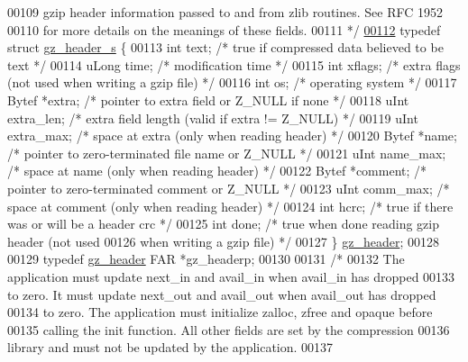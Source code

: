 \begin{DoxyCode}
00109 \textcolor{comment}{     gzip header information passed to and from zlib routines.  See RFC 1952}
00110 \textcolor{comment}{  for more details on the meanings of these fields.}
00111 \textcolor{comment}{*/}
\hyperlink{structgz__header__s}{00112} \textcolor{keyword}{typedef} \textcolor{keyword}{struct }\hyperlink{structgz__header__s}{gz\_header\_s} \{
00113     \textcolor{keywordtype}{int}     text;       \textcolor{comment}{/* true if compressed data believed to be text */}
00114     uLong   time;       \textcolor{comment}{/* modification time */}
00115     \textcolor{keywordtype}{int}     xflags;     \textcolor{comment}{/* extra flags (not used when writing a gzip file) */}
00116     \textcolor{keywordtype}{int}     os;         \textcolor{comment}{/* operating system */}
00117     Bytef   *extra;     \textcolor{comment}{/* pointer to extra field or Z\_NULL if none */}
00118     uInt    extra\_len;  \textcolor{comment}{/* extra field length (valid if extra != Z\_NULL) */}
00119     uInt    extra\_max;  \textcolor{comment}{/* space at extra (only when reading header) */}
00120     Bytef   *name;      \textcolor{comment}{/* pointer to zero-terminated file name or Z\_NULL */}
00121     uInt    name\_max;   \textcolor{comment}{/* space at name (only when reading header) */}
00122     Bytef   *comment;   \textcolor{comment}{/* pointer to zero-terminated comment or Z\_NULL */}
00123     uInt    comm\_max;   \textcolor{comment}{/* space at comment (only when reading header) */}
00124     \textcolor{keywordtype}{int}     hcrc;       \textcolor{comment}{/* true if there was or will be a header crc */}
00125     \textcolor{keywordtype}{int}     done;       \textcolor{comment}{/* true when done reading gzip header (not used}
00126 \textcolor{comment}{                           when writing a gzip file) */}
00127 \} \hyperlink{structgz__header__s}{gz\_header};
00128 
00129 \textcolor{keyword}{typedef} \hyperlink{structgz__header__s}{gz\_header} FAR *gz\_headerp;
00130 
00131 \textcolor{comment}{/*}
00132 \textcolor{comment}{     The application must update next\_in and avail\_in when avail\_in has dropped}
00133 \textcolor{comment}{   to zero.  It must update next\_out and avail\_out when avail\_out has dropped}
00134 \textcolor{comment}{   to zero.  The application must initialize zalloc, zfree and opaque before}
00135 \textcolor{comment}{   calling the init function.  All other fields are set by the compression}
00136 \textcolor{comment}{   library and must not be updated by the application.}
00137 \textcolor{comment}{}

\end{DoxyCode}
